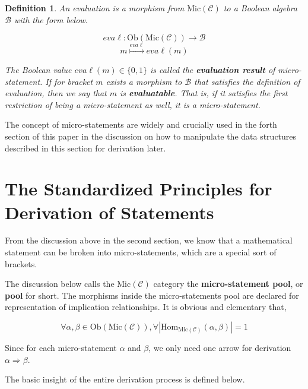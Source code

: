 \documentclass{article}
\newtheorem{definition}{Definition}
\begin{document}
\begin{definition}
	An evaluation is a morphism from \(\text{Mic}(\mathcal{C})\) to a Boolean algebra \(\mathcal{B}\) with the form below.
	
	\[\mathit{e}\mathit{v}\mathit{a}\ell :\text{Ob}(\text{Mic}(\mathcal{C}))\to \mathcal{B}\]
	\[\mathit{m}\overset{\mathit{e}\mathit{v}\mathit{a}\ell }{\mapsto }\mathit{e}\mathit{v}\mathit{a}\ell (\mathit{m})\]
	
	The Boolean value \(\mathit{e}\mathit{v}\mathit{a}\ell (\mathit{m})\in \{0,1\}\) is called the \textbf{ evaluation result} of micro-statement. If for bracket \(\mathit{m}\) exists a morphism to \(\mathcal{B}\) that satisfies the definition of evaluation, then we say that \(\mathit{m}\) is \textbf{ evaluatable}. That is, if it satisfies the first restriction of being a micro-statement as well, it is a micro-statement.
\end{definition}

The concept of micro-statements are widely and crucially used in the forth section of this paper in the discussion on how to manipulate the data structures described in this section for derivation later.

\section*{The Standardized Principles for Derivation of Statements}

From the discussion above in the second section, we know that a mathematical statement can be broken into micro-statements, which are a special sort of brackets.

The discussion below calls the \(\text{Mic}(\mathcal{C})\) category the \textbf{ micro-statement pool}, or \textbf{ pool} for short. The morphisms inside the micro-statements pool are declared for representation of implication relationships. It is obvious and elementary that,

\[\forall \alpha ,\beta \in \text{Ob}(\text{Mic}(\mathcal{C})), \forall \left|\text{Hom}_{\text{Mic}(\mathcal{C})}(\alpha ,\beta )\right|=1\]

Since for each micro-statement \(\alpha\) and \(\beta\), we only need one arrow for derivation \(\alpha \Rightarrow \beta\).

The basic insight of the entire derivation process is defined below.
\end{document}

